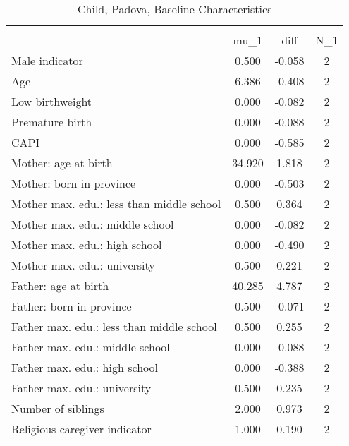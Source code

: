 \begin{table}[htbp]\centering
\def\sym#1{\ifmmode^{#1}\else\(^{#1}\)\fi}
\caption{Child, Padova, Baseline Characteristics}
\begin{tabular}{l*{1}{ccc}}
\toprule
                    &\multicolumn{3}{c}{}                           \\
                    &        mu\_1         &        diff&         N\_1\\
\midrule
Male indicator      &       0.500         &      -0.058&           2\\
Age                 &       6.386         &      -0.408&           2\\
Low birthweight     &       0.000         &      -0.082&           2\\
Premature birth     &       0.000         &      -0.088&           2\\
CAPI                &       0.000         &      -0.585&           2\\
Mother: age at birth&      34.920         &       1.818&           2\\
Mother: born in province&       0.000         &      -0.503&           2\\
Mother max. edu.: less than middle school&       0.500         &       0.364&           2\\
Mother max. edu.: middle school&       0.000         &      -0.082&           2\\
Mother max. edu.: high school&       0.000         &      -0.490&           2\\
Mother max. edu.: university&       0.500         &       0.221&           2\\
Father: age at birth&      40.285         &       4.787&           2\\
Father: born in province&       0.500         &      -0.071&           2\\
Father max. edu.: less than middle school&       0.500         &       0.255&           2\\
Father max. edu.: middle school&       0.000         &      -0.088&           2\\
Father max. edu.: high school&       0.000         &      -0.388&           2\\
Father max. edu.: university&       0.500         &       0.235&           2\\
Number of siblings  &       2.000         &       0.973&           2\\
Religious caregiver indicator&       1.000         &       0.190&           2\\

\end{tabular}
\end{table}
